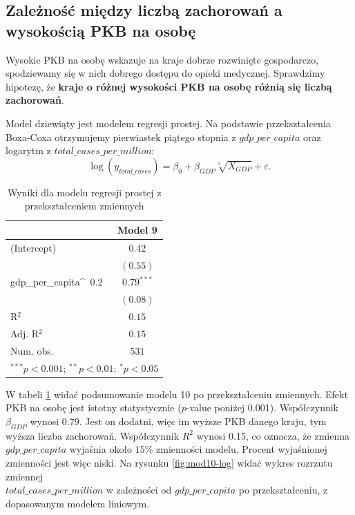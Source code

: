 \documentclass[12pt]{mwbk}
\theoremstyle{plain}
\theoremstyle{definition}
\theoremstyle{definition}
\begin{document}
\subsection{Zależność między liczbą zachorowań a wysokością PKB na osobę}

Wysokie PKB na osobę wskazuje na kraje dobrze rozwinięte gospodarczo, spodziewamy się w nich dobrego dostępu do opieki medycznej. Sprawdzimy hipotezę, że \textbf{kraje o różnej wysokości PKB na osobę różnią się liczbą zachorowań}.


Model dziewiąty jest modelem regresji prostej. Na podstawie przekształcenia Boxa-Coxa otrzymujemy pierwiastek piątego stopnia z $gdp\_per\_capita$ oraz logarytm z $total\_cases\_per\_million$:
$$\log(y_{total\_cases})=\beta_0+\beta_{GDP}\sqrt[5]{X_{GDP}}+\varepsilon.$$

\newpage

\begin{table}[!htbp]
	\begin{center}
		\begin{tabular}{l c}
			\hline
			& Model 9 \\
			\hline
			(Intercept)          & $0.42$       \\
			& $(0.55)$     \\
			gdp\_per\_capita\^~0.2 & $0.79^{***}$ \\
			& $(0.08)$     \\
			\hline
			R$^2$                & $0.15$       \\
			Adj. R$^2$           & $0.15$       \\
			Num. obs.            & $531$        \\
			\hline
			\multicolumn{2}{l}{\scriptsize{$^{***}p<0.001$; $^{**}p<0.01$; $^{*}p<0.05$}}
		\end{tabular}
		\caption{Wyniki dla modelu regresji prostej z przekształceniem zmiennych}
		\label{table:mod10-log}
	\end{center}
\end{table}

W tabeli \ref{table:mod10-log} widać podsumowanie modelu 10 po przekształceniu zmiennych.
Efekt PKB na osobę jest istotny statystycznie ($p$-value poniżej 0.001). Współczynnik $\beta_{GDP}$ wynosi 0.79. Jest on dodatni, więc im wyższe PKB danego kraju, tym wyższa liczba zachorowań. Współczynnik $R^2$ wynosi 0.15, co oznacza, że zmienna $gdp\_per\_capita$ wyjaśnia około $15\%$ zmienności modelu. Procent wyjaśnionej zmienności jest więc niski. Na rysunku \ref{fig:mod10-log} widać wykres rozrzutu zmiennej \\$total\_cases\_per\_million$ w zależności od $gdp\_per\_capita$ po przekształceniu, z dopasowanym modelem liniowym.
\end{document}
